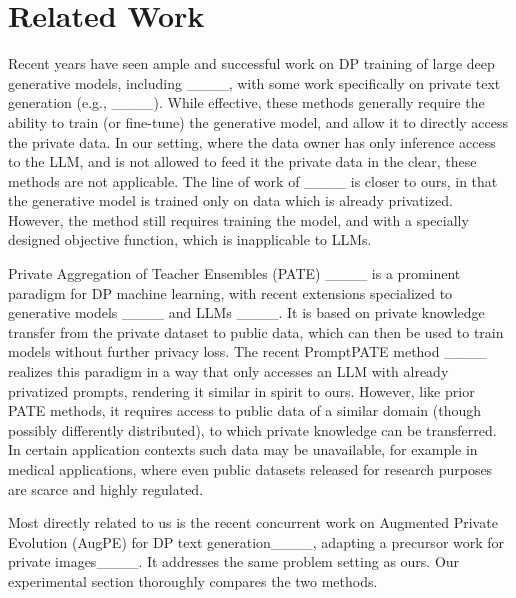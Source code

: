 \section{Related Work}
\label{sec:related}


Recent years have seen ample and successful work on DP training of large deep generative models, including ____, with some work specifically on private text generation (e.g., ____).
While effective, these methods generally require the ability to train (or fine-tune) the generative model, and allow it to directly access the private data. In our setting, where the data owner has only inference access to the LLM, and is not allowed to feed it the private data in the clear, these methods are not applicable. The line of work of ____ is closer to ours, in that the generative model is trained only on data which is already privatized. However, the method still requires training the model, and with a specially designed objective function, which is inapplicable to LLMs. 

Private Aggregation of Teacher Ensembles (PATE) ____ is a prominent paradigm for DP machine learning, with recent extensions specialized to generative models ____ and LLMs 
____. It is based on private knowledge transfer from the private dataset to public data, which can then be used to train models without further privacy loss. The recent PromptPATE method ____ realizes this paradigm in a way that only accesses an LLM with already privatized prompts, rendering it similar in spirit to ours. However, like prior PATE methods, it requires access to public data of a similar domain (though possibly differently distributed), to which private knowledge can be transferred.
In certain application contexts such data may be unavailable, for example in medical applications, where even public datasets released for research purposes are scarce and highly regulated. 


Most directly related to us is the recent concurrent work on Augmented Private Evolution (AugPE) for DP text generation____, adapting a precursor work for private images____. It addresses the same problem setting as ours. Our experimental section thoroughly compares the two methods. 

